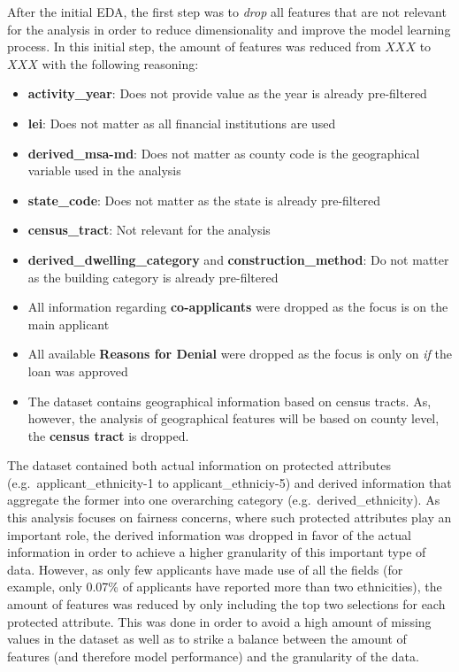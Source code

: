 After the initial EDA, the first step was to \textit{drop} all features that are not relevant for the analysis in order to reduce dimensionality and improve the model learning process. \@ 
In this initial step, the amount of features was reduced from $XXX$ to $XXX$ with the following reasoning:
\begin{itemize}
    \item \textbf{activity\_year}: Does not provide value as the year is already pre-filtered
    \item \textbf{lei}: Does not matter as all financial institutions are used
    \item \textbf{derived\_msa-md}: Does not matter as county code is the geographical variable used in the analysis
    \item \textbf{state\_code}: Does not matter as the state is already pre-filtered
    \item \textbf{census\_tract}: Not relevant for the analysis
    \item \textbf{derived\_dwelling\_category} and \textbf{construction\_method}: Do not matter as the building category is already pre-filtered
    \item All information regarding \textbf{co-applicants} were dropped as the focus is on the main applicant
    \item All available \textbf{Reasons for Denial} were dropped as the focus is only on \textit{if} the loan was approved
    \item The dataset contains geographical information based on census tracts. As, however, the analysis of geographical features will be based on county level, the \textbf{census tract} is dropped.
\end{itemize}

The dataset contained both actual information on protected attributes (e.g.\ \mbox{applicant\_ethnicity-1} to \mbox{applicant\_ethniciy-5}) and derived information that aggregate the former into one overarching category (e.g.\ \mbox{derived\_ethnicity}). 
As this analysis focuses on fairness concerns, where such protected attributes play an important role, the derived information was dropped in favor of the actual information in order to achieve a higher granularity of this important type of data.  
However, as only few applicants have made use of all the fields (for example, only 0.07\% of applicants have reported more than two ethnicities), the amount of features was reduced by only including the top two selections for each protected attribute. 
This was done in order to avoid a high amount of missing values in the dataset as well as to strike a balance between the amount of features (and therefore model performance) and the granularity of the data.

